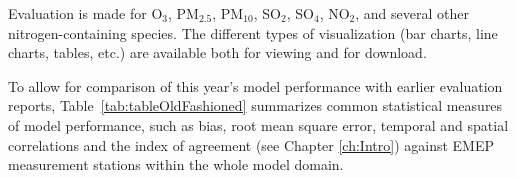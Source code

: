 Evaluation is made for O$_{3}$, PM$_{2.5}$, PM$_{10}$, SO$_{2}$, SO$_{4}$,
NO$_{2}$, and several other nitrogen-containing species.
The different types of visualization (bar charts, line charts, tables,
etc.) are available both for viewing and for download.

\vspace{1cm}

To allow for comparison of this year's model performance with earlier evaluation reports, Table~\ref{tab:tableOldFashioned} summarizes common statistical measures of model performance, such as bias, root mean square error, temporal and spatial correlations and the index of agreement (see Chapter \ref{ch:Intro}) against EMEP measurement stations within the whole model domain.

\begin{table}\small


\end{table}
